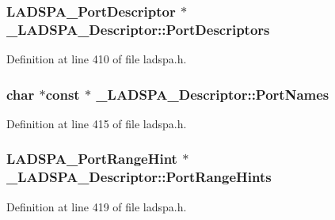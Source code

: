 \subsubsection[{\texorpdfstring{Port\+Descriptors}{PortDescriptors}}]{ {\bf L\+A\+D\+S\+P\+A\+\_\+\+Port\+Descriptor} $\ast$ \+\_\+\+L\+A\+D\+S\+P\+A\+\_\+\+Descriptor\+::\+Port\+Descriptors}\hypertarget{struct___l_a_d_s_p_a___descriptor_acbd16cbd610dd708c712ea67e05ce805}{}\label{struct___l_a_d_s_p_a___descriptor_acbd16cbd610dd708c712ea67e05ce805}


Definition at line 410 of file ladspa.\+h.

\subsubsection[{\texorpdfstring{Port\+Names}{PortNames}}]{ char $\ast${\bf const} $\ast$ \+\_\+\+L\+A\+D\+S\+P\+A\+\_\+\+Descriptor\+::\+Port\+Names}\hypertarget{struct___l_a_d_s_p_a___descriptor_a2912b6611e0d187cc7a7a9ae251df518}{}\label{struct___l_a_d_s_p_a___descriptor_a2912b6611e0d187cc7a7a9ae251df518}


Definition at line 415 of file ladspa.\+h.

\subsubsection[{\texorpdfstring{Port\+Range\+Hints}{PortRangeHints}}]{ {\bf L\+A\+D\+S\+P\+A\+\_\+\+Port\+Range\+Hint} $\ast$ \+\_\+\+L\+A\+D\+S\+P\+A\+\_\+\+Descriptor\+::\+Port\+Range\+Hints}\hypertarget{struct___l_a_d_s_p_a___descriptor_ad6117a9bbd25f27711c5f87670ee55dd}{}\label{struct___l_a_d_s_p_a___descriptor_ad6117a9bbd25f27711c5f87670ee55dd}


Definition at line 419 of file ladspa.\+h.

